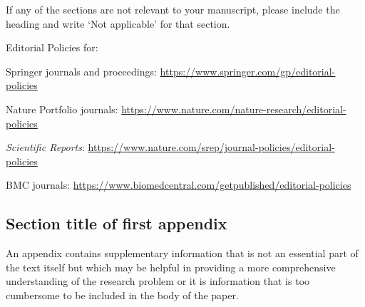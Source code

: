 \documentclass[pdflatex,sn-basic]{sn-jnl}%
\theoremstyle{thmstyleone}%
\theoremstyle{thmstyletwo}%
\theoremstyle{thmstylethree}%
\begin{document}
  \noindent
  If any of the sections are not relevant to your manuscript, please include the heading and write `Not applicable' for that
  section.

  \bigskip
  \begin{flushleft}%
  Editorial Policies for:

  \bigskip\noindent
  Springer journals and proceedings: \url{https://www.springer.com/gp/editorial-policies}

  \bigskip\noindent
  Nature Portfolio journals: \url{https://www.nature.com/nature-research/editorial-policies}

  \bigskip\noindent
  \textit{Scientific Reports}: \url{https://www.nature.com/srep/journal-policies/editorial-policies}

  \bigskip\noindent
  BMC journals: \url{https://www.biomedcentral.com/getpublished/editorial-policies}
  \end{flushleft}

  \begin{appendices}

  \section{Section title of first appendix}\label{secA1}

  An appendix contains supplementary information that is not an essential part of the text itself but which may be helpful in
  providing a more comprehensive understanding of the research problem or it is information that is too cumbersome to be included
  in the body of the paper.






  \end{appendices}
\end{document}
